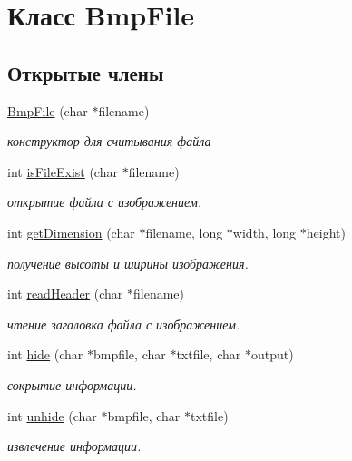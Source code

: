\hypertarget{classBmpFile}{}\section{Класс Bmp\+File}
\label{classBmpFile}
\subsection*{Открытые члены}
\begin{DoxyCompactItemize}
\item 
\hyperlink{classBmpFile_aed9f5a62b69ee09e62f75ff70317e027}{Bmp\+File} (char $\ast$filename)
\begin{DoxyCompactList}\small\item\em конструктор для считывания файла \end{DoxyCompactList}\item 
int \hyperlink{classBmpFile_a4b19c02adb6237073491bd44e389d9f2}{is\+File\+Exist} (char $\ast$filename)
\begin{DoxyCompactList}\small\item\em открытие файла с изображением. \end{DoxyCompactList}\item 
int \hyperlink{classBmpFile_a917e862e4813dbef1a4e94fa67a83832}{get\+Dimension} (char $\ast$filename, long $\ast$width, long $\ast$height)
\begin{DoxyCompactList}\small\item\em получение высоты и ширины изображения. \end{DoxyCompactList}\item 
int \hyperlink{classBmpFile_aea6e2670a066a2967837c54323d7eaf0}{read\+Header} (char $\ast$filename)
\begin{DoxyCompactList}\small\item\em чтение загаловка файла с изображением. \end{DoxyCompactList}\item 
int \hyperlink{classBmpFile_a0ba2aa19f5b7d478a266bd0a162840b7}{hide} (char $\ast$bmpfile, char $\ast$txtfile, char $\ast$output)
\begin{DoxyCompactList}\small\item\em сокрытие информации. \end{DoxyCompactList}\item 
int \hyperlink{classBmpFile_adcc78879312808ffbe64dfadff699450}{unhide} (char $\ast$bmpfile, char $\ast$txtfile)
\begin{DoxyCompactList}\small\item\em извлечение информации. \end{DoxyCompactList}\item 

\end{DoxyCompactItemize}
